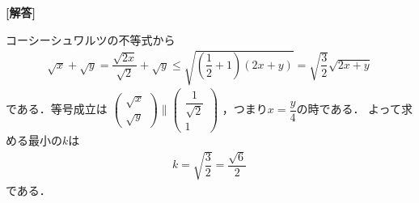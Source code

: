 \documentclass[../../main.tex]{subfiles}
\begin{document}
\begin{oframed}
  
\end{oframed}

{\bf [解答]}

コーシーシュワルツの不等式から
\begin{align}
  \sqrt{x}+\sqrt{y}
  = \dfrac{\sqrt{2x}}{\sqrt{2}}+\sqrt{y}
  \le \sqrt{\left(\dfrac{1}{2}+1\right)(2x+y)}
  = \sqrt{\dfrac{3}{2}}\sqrt{2x+y}
\end{align}
である．等号成立は
$
\begin{pmatrix}\sqrt{x}\\\sqrt{y}
\end{pmatrix}\parallel
\begin{pmatrix}\dfrac{1}{\sqrt{2}}\\1
\end{pmatrix}$
，つまり$x=\dfrac{y}{4}$の時である．
よって求める最小の$k$は
\begin{align}
  k = \sqrt{\dfrac{3}{2}} = \dfrac{\sqrt{6}}{2}
\end{align}
である．

\newpage
\end{document}
